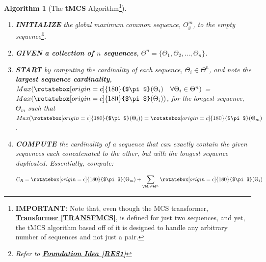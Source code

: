 \documentclass[a4paper, 18pt]{book} %
\newtheorem{alg}{Algorithm}
\newcommand{\invpi}{\rotatebox[origin=c]{180}{$\pi$}}
\begin{document}
\vspace{2em}
\begin{alg}[The \textbf{tMCS} Algorithm\footnote{\textbf{IMPORTANT:} Note that, even though the MCS transformer, \textbf{\hyperref[TRANSFMCS]{Transformer \ref{TRANSFMCS}}}, is defined for just two sequences, and yet, the tMCS algorithm based off of it is designed to handle any arbitrary number of sequences and not just a pair.}]
\label{ALGtMCS}
$ $
\begin{enumerate}
\item{\textbf{INITIALIZE} the global maximum common sequence, $O^m_g$, to the empty sequence\footnote{Refer to \textbf{\hyperref[RES1]{Foundation Idea \ref{RES1}}}}.} 
\item{
\textbf{GIVEN}  \textbf{a collection of $n$ sequences}, $\Theta^n = \{\Theta_1, \Theta_2,..., \Theta_n\}$.
}
\item{
\textbf{START}  by computing the cardinality of each sequence, $\Theta_i \in \Theta^n$, and note the \textbf{largest sequence cardinality}, $Max(\invpi(\Theta_i) \quad \forall \Theta_i \in \Theta^n)$ = $Max(\invpi(\Theta_i))$, for the longest sequence, $\Theta_m$ such that $Max(\invpi(\Theta_i)) = \invpi(\Theta_m)$.
}
\item {
\textbf{COMPUTE}  the cardinality of a sequence that can exactly contain the given sequences each concatenated to the other, but with the longest sequence duplicated. Essentially, compute:

\begin{equation}
\label{EQLSEQ}
C_R = \invpi(\Theta_m) + \sum\limits_{\forall \Theta_i \in \Theta^n} \invpi(\Theta_i)
\end{equation}

}
\end{enumerate}
\end{alg}
\end{document}
